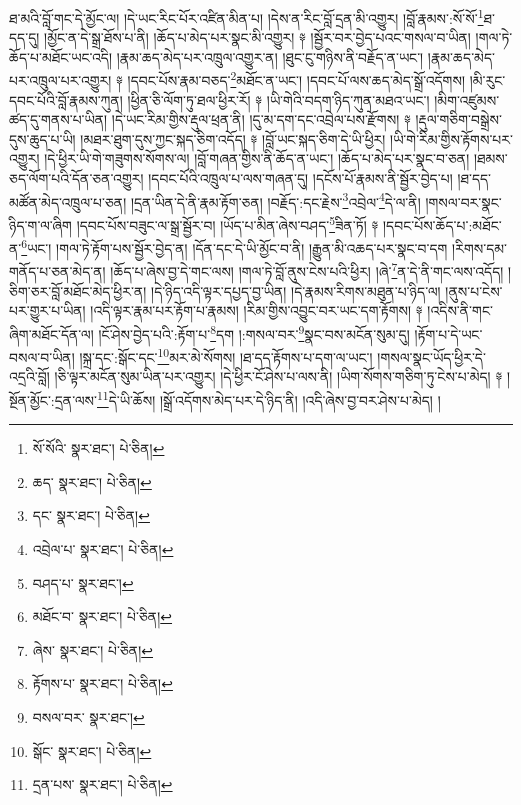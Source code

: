 ཐ་མའི་བློ་གང་དེ་མྱོང་ལ། །དེ་ཡང་རིང་པོར་འཛིན་མིན་པ། །དེས་ན་རིང་བློ་དྲན་མི་འགྱུར། །བློ་རྣམས་:སོ་སོ་\footnote{སོ་སོའི་  སྣར་ཐང་།  པེ་ཅིན། }ཐ་དད་དུ། །མྱོང་ན་དེ་སྒྲ་ཐོས་པ་ནི། །ཆོད་པ་མེད་པར་སྣང་མི་འགྱུར། ༈ །སྦྱོར་བར་བྱེད་པའང་གསལ་བ་ཡིན། །གལ་ཏེ་ཆོད་པ་མཐོང་ཡང་འདི། །རྣམ་ཆད་མེད་པར་འཁྲུལ་འགྱུར་ན། །ཐུང་ངུ་གཉིས་ནི་བརྗོད་ན་ཡང་། །རྣམ་ཆད་མེད་པར་འཁྲུལ་པར་འགྱུར། ༈ །དབང་པོས་རྣམ་བཅད་\footnote{ཆད་  སྣར་ཐང་།  པེ་ཅིན། }མཐོང་ན་ཡང་། །དབང་པོ་ལས་ཆད་མེད་སྒྲོ་འདོགས། །མི་རུང་དབང་པོའི་བློ་རྣམས་ཀུན། །ཕྱིན་ཅི་ལོག་ཏུ་ཐལ་ཕྱིར་རོ། ༈ །ཡི་གེའི་བདག་ཉིད་ཀུན་མཐའ་ཡང་། །མིག་འཛུམས་ཚད་དུ་གནས་པ་ཡིན། །དེ་ཡང་རིམ་གྱིས་རྡུལ་ཕྲན་ནི། །དུ་མ་དག་དང་འབྲེལ་པས་རྫོགས། ༈ །རྡུལ་གཅིག་བསྒྲེས་དུས་ཆུད་པ་ཡི། །མཐར་ཐུག་དུས་ཀྱང་སྐད་ཅིག་འདོད། ༈ །བློ་ཡང་སྐད་ཅིག་དེ་ཡི་ཕྱིར། །ཡི་གེ་རིམ་གྱིས་རྟོགས་པར་འགྱུར། །དེ་ཕྱིར་ཡི་གེ་གཟུགས་སོགས་ལ། །བློ་གཞན་གྱིས་ནི་ཆོད་ན་ཡང་། །ཆོད་པ་མེད་པར་སྣང་བ་ཅན། །ཐམས་ཅད་ལོག་པའི་དོན་ཅན་འགྱུར། །དབང་པོའི་འཁྲུལ་པ་ལས་གཞན་དུ། །དངོས་པོ་རྣམས་ནི་སྦྱོར་བྱེད་པ། །ཐ་དད་མཚོན་མེད་འཁྲུལ་པ་ཅན། །དྲན་ཡིན་དེ་ནི་རྣམ་རྟོག་ཅན། །བརྗོད་:དང་རྗེས་\footnote{དང་  སྣར་ཐང་།  པེ་ཅིན། }འབྲེལ་\footnote{འབྲེལ་པ་  སྣར་ཐང་།  པེ་ཅིན། }དེ་ལ་ནི། །གསལ་བར་སྣང་ཉིད་ག་ལ་ཞིག །དབང་པོས་བཟུང་ལ་སྒྲ་སྦྱོར་བ། །ཡོད་པ་མིན་ཞེས་བཤད་\footnote{བཤད་པ་  སྣར་ཐང་། }ཟིན་ཏོ། ༈ །དབང་པོས་ཆོད་པ་:མཐོང་ན་\footnote{མཐོང་བ་  སྣར་ཐང་།  པེ་ཅིན། }ཡང་། །གལ་ཏེ་རྟོག་པས་སྦྱོར་བྱེད་ན། །དོན་དང་དེ་ཡི་མྱོང་བ་ནི། །རྒྱུན་མི་འཆད་པར་སྣང་བ་དག །རིགས་དམ་གནོད་པ་ཅན་མེད་ན། །ཆོད་པ་ཞེས་བྱ་དེ་གང་ལས། །གལ་ཏེ་བློ་ནུས་ངེས་པའི་ཕྱིར། །ཞེ་\footnote{ཞེས་  སྣར་ཐང་།  པེ་ཅིན། }ན་དེ་ནི་གང་ལས་འདོད། །ཅིག་ཅར་བློ་མཐོང་མེད་ཕྱིར་ན། །དེ་ཉིད་འདི་ལྟར་དཔྱད་བྱ་ཡིན། །དེ་རྣམས་རིགས་མཐུན་པ་ཉིད་ལ། །ནུས་པ་ངེས་པར་གྱུར་པ་ཡིན། །འདི་ལྟར་རྣམ་པར་རྟོག་པ་རྣམས། །རིམ་གྱིས་འབྱུང་བར་ཡང་དག་རྟོགས། ༈ །འདིས་ནི་གང་ཞིག་མཐོང་དོན་ལ། །ངོ་ཤེས་བྱེད་པའི་:རྟོག་པ་\footnote{རྟོགས་པ་  སྣར་ཐང་།  པེ་ཅིན། }དག །:གསལ་བར་\footnote{བསལ་བར་  སྣར་ཐང་། }སྣང་བས་མངོན་སུམ་དུ། །རྟོག་པ་དེ་ཡང་བསལ་བ་ཡིན། །སྐྲ་དང་:སྒོང་དང་\footnote{སྒོང་  སྣར་ཐང་།  པེ་ཅིན། }མར་མེ་སོགས། །ཐ་དད་རྟོགས་པ་དག་ལ་ཡང་། །གསལ་སྣང་ཡོད་ཕྱིར་དེ་འདྲའི་བློ། །ཅི་ལྟར་མངོན་སུམ་ཡིན་པར་འགྱུར། །དེ་ཕྱིར་ངོ་ཤེས་པ་ལས་ནི། །ཡིག་སོགས་གཅིག་ཏུ་ངེས་པ་མེད། ༈ །སྔོན་མྱོང་:དྲན་ལས་\footnote{དྲན་པས་  སྣར་ཐང་།  པེ་ཅིན། }དེ་ཡི་ཆོས། །སྒྲོ་འདོགས་མེད་པར་དེ་ཉིད་ནི། །འདི་ཞེས་བྱ་བར་ཤེས་པ་མེད། །
